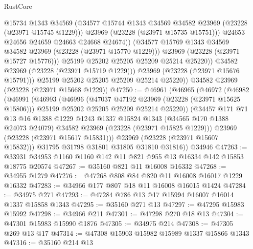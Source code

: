 \begin{lexlean}{RustCore}
\begin{coremodule}
                        @15734
                        @1343
                        @34569
                        (@34577 @15744 @1343 @34569 @34582 @23969 (@23228 (@23971 @15745 @1229)))
                        @23969
                        (@23228 (@23971 @15735 @15751)))
                      @24653
                      @24656
                      @24659
                      @24663
                      @24668
                      @24674))
                  (@34577 @15769 @1343 @34569 @34582 @23969 (@23228 (@23971 @15770 @1229)))
                  @23969
                  (@23228 (@23971 @15727 @15776)))
                @25199
                @25202
                @25205
                @25209
                @25214
                @25220))
            @34582
            @23969
            (@23228 (@23971 @15719 @1229)))
          @23969
          (@23228 (@23971 @15676 @15791)))
        @25199
        @25202
        @25205
        @25209
        @25214
        @25220))
    @34582
    @23969
    (@23228 (@23971 @15668 @1229))
@47250 := @46961
    (@46965
      (@46972
        (@46982
          (@46991
            (@46993
              (@46996
                (@47037 @47192 @23969 (@23228 (@23971 @15625 @15806)))
                @25199
                @25202
                @25205
                @25209
                @25214
                @25220))
            (@34457
              @171
              @71
              @13
              @16
              @1388
              @1229
              @1243
              @1337
              @15824
              @1343
              (@34565 @170 @1388 @24073 @24079)
              @34582
              @23969
              (@23228 (@23971 @15825 @1229)))
            @23969
            (@23228 (@23971 @15617 @15831)))
          @23969
          (@23228 (@23971 @15607 @15832)))
        @31795
        @31798
        @31801
        @31805
        @31810
        @31816))
    @34946
@47263 := @33931 @34953 @1160 @1160 @142 @11 @821 @955 @13 @16334 @142 @15853 @18775 @20574
@47267 := @35160 @821 @11 @16008 @16332
@47268 := @34955 @1279
@47276 := @47268 @808 @84 @820 @11 @16008 @16017 @1229 @16332
@47283 := @34966 @177 @807 @18 @11 @16008 @16015 @1424
@47284 := @34975 @271
@47293 := @47284 @786 @13 @17 @15994 @16007 @16014 @1337 @15858 @1343
@47295 := @35160 @271 @13
@47297 := @47295 @15983 @15992
@47298 := @34966 @211
@47301 := @47298 @270 @18 @13
@47304 := @47301 @15983 @15990 @1876
@47305 := @34975 @214
@47308 := @47305 @269 @13 @17
@47314 := @47308 @15903 @15982 @15989 @1337 @15866 @1343
@47316 := @35160 @214 @13

\end{coremodule}
\end{lexlean}
